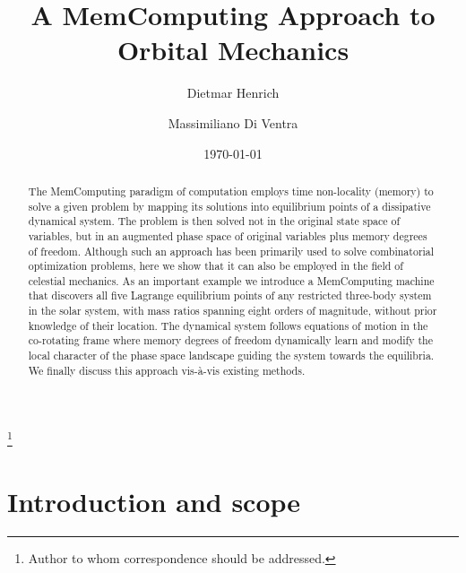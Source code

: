 \documentclass[aip,preprint,amsmath,amssymb,floatfix]{revtex4-2}
\begin{document}
\title{A MemComputing Approach to Orbital Mechanics}

\author{Dietmar Henrich}

\author{Massimiliano Di Ventra}
\thanks{Author to whom correspondence should be addressed.}

\date{\today}

\begin{abstract}
	The MemComputing paradigm of computation employs time non-locality (memory) to
	solve a given problem by mapping its solutions into equilibrium points of a dissipative dynamical
	system. The problem is then solved not in the original state space of variables,
	but in an augmented phase space of original variables plus memory degrees
	of freedom. Although such an approach has been primarily used to solve
	combinatorial optimization problems, here we show that it can also be employed in the
	field of celestial mechanics. As an important example we introduce a MemComputing
	machine that discovers all five Lagrange equilibrium points of any restricted
	three-body system in the solar system, with mass ratios spanning eight orders of magnitude, without prior knowledge of their location.
	The dynamical system follows equations of motion in the co-rotating frame where memory degrees of freedom dynamically learn and modify the local character of the phase space landscape guiding the system towards the equilibria. We finally discuss this approach vis-\`a-vis existing methods.
\end{abstract}

\maketitle
\newpage

\section{Introduction and scope}\label{sec:intro}
\end{document}
